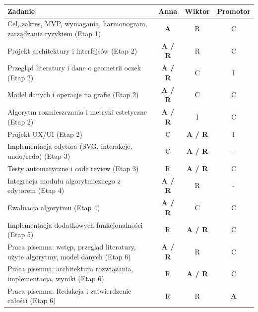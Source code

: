 \documentclass[a4paper,11pt]{article}
\begin{document}
\begin{xltabular}{0.95\textwidth}{|X|c|c|c|}
  \hline
  \textbf{Zadanie} & \textbf{Anna} & \textbf{Wiktor} & \textbf{Promotor} \\
  \hline
  Cel, zakres, MVP, wymagania, harmonogram, zarządzanie ryzykiem (Etap 1) & \textbf{A} & R & C \\
  \hline
  Projekt architektury i interfejsów (Etap 2) & \textbf{A / R} & R & C \\
  \hline
  Przegląd literatury i dane o geometrii oczek (Etap 2) & \textbf{A / R} & C & I \\
  \hline
  Model danych i operacje na grafie (Etap 2) & \textbf{A / R} & C & C \\
  \hline
  Algorytm rozmieszczania i metryki estetyczne (Etap 2) & \textbf{A / R} & I & C \\
  \hline
  Projekt UX/UI (Etap 2) & C & \textbf{A / R} & I \\
  \hline
  Implementacja edytora (SVG, interakcje, undo/redo) (Etap 3) & C & \textbf{A / R} & - \\
  \hline
  Testy automatyczne i code review (Etap 3) & R & \textbf{A / R} & C \\
  \hline
  Integracja modułu algorytmicznego z edytorem (Etap 4) & \textbf{A / R} & R & - \\
  \hline
  Ewaluacja algorytmu (Etap 4) & \textbf{A / R} & C & C \\
  \hline
  Implementacja dodatkowych funkcjonalności (Etap 5) & R & \textbf{A / R} & C \\
  \hline
  Praca pisemna: wstęp, przegląd literatury, użyte algorytmy, model danych (Etap 6) & \textbf{A / R} & R & C \\
  \hline
  Praca pisemna: architektura rozwiązania, implementacja, wyniki (Etap 6) & R & \textbf{A / R} & C \\
  \hline
  Praca pisemna: Redakcja i zatwierdzenie całości (Etap 6) & R & R & \textbf{A} \\
  \hline
\end{xltabular}

\pagebreak

\end{document}
